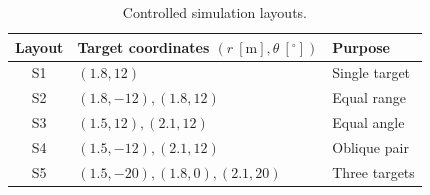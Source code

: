 \begin{table}[t]
\centering
\caption{Controlled simulation layouts.}
\label{tab:sim_layouts}
\footnotesize
\begin{tabular}{cll}
\hline
Layout & Target coordinates $(r~[\mathrm m],\theta~[^\circ])$ & Purpose \\
\hline
S1 & $(1.8,12)$ & Single target \\
S2 & $(1.8,-12),(1.8,12)$ & Equal range \\
S3 & $(1.5,12),(2.1,12)$ & Equal angle \\
S4 & $(1.5,-12),(2.1,12)$ & Oblique pair \\
S5 & $(1.5,-20),(1.8,0),(2.1,20)$ & Three targets \\
\hline
\end{tabular}
\end{table}
